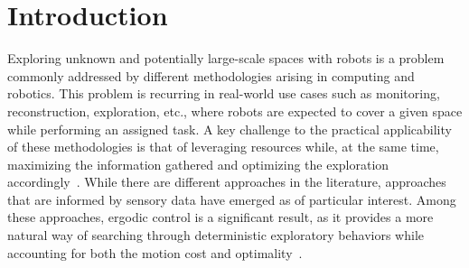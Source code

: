 \documentclass[letterpaper,10pt,conference,twoside]{IEEEtran}
\theoremstyle{definition}
\begin{document}
\section{Introduction}
\noindent
Exploring unknown and potentially large-scale spaces with robots is a problem commonly addressed by different methodologies arising in computing and robotics. This problem is recurring in real-world use cases such as monitoring, reconstruction, exploration, etc., where robots are expected to cover a given space while performing an assigned task. A key challenge to the practical applicability of these methodologies is that of leveraging resources while, at the same time, maximizing the information gathered and optimizing the exploration accordingly~\cite{popovic2020informative,schmid2020efficient}. 
While there are different approaches in the literature, approaches that are informed by sensory data have emerged as of particular interest. Among these approaches, ergodic control is a significant result, as it provides a more natural way of searching through deterministic exploratory behaviors while accounting for both the motion cost and optimality~\cite{miller2016ergodic}.
\end{document}
